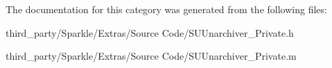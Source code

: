 The documentation for this category was generated from the following files\+:\begin{DoxyCompactItemize}
\item 
third\+\_\+party/\+Sparkle/\+Extras/\+Source Code/S\+U\+Unarchiver\+\_\+\+Private.\+h\item 
third\+\_\+party/\+Sparkle/\+Extras/\+Source Code/S\+U\+Unarchiver\+\_\+\+Private.\+m\end{DoxyCompactItemize}
